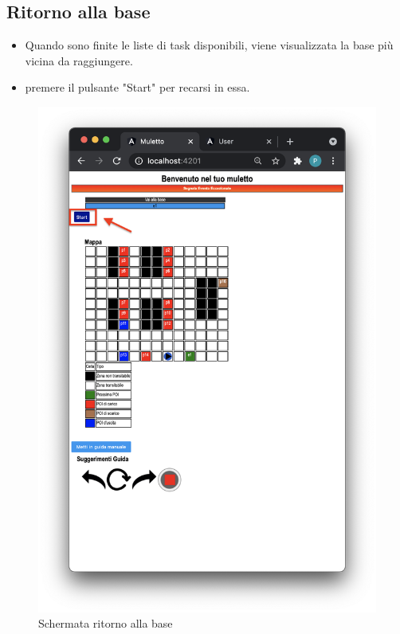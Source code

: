 \subsection{Ritorno alla base}
\begin{itemize}
    \item Quando sono finite le liste di task disponibili, viene visualizzata la base più vicina da raggiungere.
    \item premere il pulsante "Start" per recarsi in essa.
\end{itemize}
\begin{figure}[H]
    \centering
    \includegraphics[scale=0.45]{res/images/ritornoallabase.png}
    \caption{Schermata ritorno alla base}
\end{figure}

